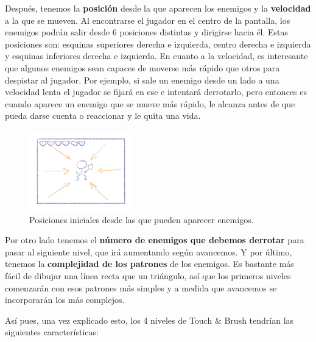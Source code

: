 \vspace{0.5cm}

Después, tenemos la \textbf{posición} desde la que aparecen los enemigos y la \textbf{velocidad} a la que se mueven. Al encontrarse el jugador en el centro de la pantalla, los enemigos podrán salir desde 6 posiciones distintas y dirigirse hacia él. Estas posiciones son: esquinas superiores derecha e izquierda, centro derecha e izquierda y esquinas inferiores derecha e izquierda. En cuanto a la velocidad, es interesante que algunos enemigos sean capaces de moverse más rápido que otros para despistar al jugador. Por ejemplo, si sale un enemigo desde un lado a una velocidad lenta el jugador se fijará en ese e intentará derrotarlo, pero entonces es cuando aparece un enemigo que se mueve más rápido, le alcanza antes de que pueda darse cuenta o reaccionar y le quita una vida.

\clearpage

\begin{figure}[htbp]
\centering
  \includegraphics[width=0.4\textwidth]{archivos/pos_enemies.jpg}
  \caption{Posiciones iniciales desde las que pueden aparecer enemigos.}
  \label{fig:pos_enemies}
\end{figure}

Por otro lado tenemos el \textbf{número de enemigos que debemos derrotar} para pasar al siguiente nivel, que irá aumentando según avancemos. Y por último, tenemos la \textbf{complejidad de los patrones} de los enemigos. Es bastante más fácil de dibujar una línea recta que un triángulo, así que los primeros niveles comenzarán con esos patrones más simples y a medida que avancemos se incorporarán los más complejos.

\vspace{0.5cm}

Así pues, una vez explicado esto, los 4 niveles de Touch \& Brush tendrían las siguientes características:

